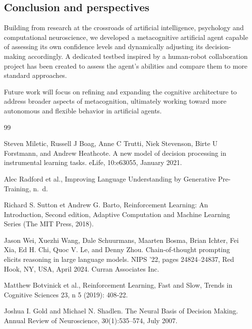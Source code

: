 \documentclass[10pt, a4paper]{collection-edmi}
\begin{document}
\begin{content}
\section{Conclusion and perspectives}

Building from research at the crossroads of artificial intelligence, psychology and computational neuroscience, we developed a metacognitive artificial agent capable of assessing its own confidence levels and dynamically adjusting its decision-making accordingly. A dedicated testbed inspired by a human-robot collaboration project has been created to assess the agent's abilities and compare them to more standard approaches.

Future work will focus on refining and expanding the cognitive architecture to address broader aspects of metacognition, ultimately working toward more autonomous and flexible behavior in artificial agents.


\begin{thebibliography}{99}

Steven Miletic, Russell J Boag, Anne C Trutti, Niek Stevenson, Birte U Forstmann, and Andrew Heathcote. A new model of decision processing in instrumental learning tasks. eLife, 10:e63055, January 2021.

Alec Radford et al., Improving Language Understanding by Generative Pre-Training, n. d.

Richard S. Sutton et Andrew G. Barto, Reinforcement Learning: An Introduction, Second edition, Adaptive Computation and Machine Learning Series (The MIT Press, 2018).

Jason Wei, Xuezhi Wang, Dale Schuurmans, Maarten Bosma, Brian Ichter, Fei Xia, Ed H. Chi, Quoc V. Le, and Denny Zhou. Chain-of-thought prompting elicits reasoning in large language models. NIPS ’22, pages 24824–24837, Red Hook, NY, USA, April 2024. Curran Associates Inc.

Matthew Botvinick et al., Reinforcement Learning, Fast and Slow, Trends in Cognitive Sciences 23, n 5 (2019): 408‑22.

Joshua I. Gold and Michael N. Shadlen. The Neural Basis of Decision Making. Annual Review of Neuroscience, 30(1):535–574, July 2007.


\end{thebibliography}
\end{content}
\end{document}
